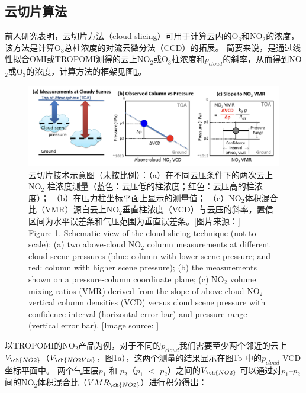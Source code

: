 \subsection{云切片算法} \label{sec:cloud-slicing}

前人研究表明，云切片方法（cloud-slicing）可用于计算云内的O$_3$和NO$_2$的浓度，
该方法是计算O$_3$总柱浓度的对流云微分法（CCD）的拓展\citep{Ziemke.1998,Ziemke.2001}。
简要来说，是通过线性拟合OMI或TROPOMI测得的云上NO$_2$或O$_3$柱浓度和$p_{cloud}$的斜率，从而得到NO$_2$或O$_3$的浓度，计算方法的框架见图\ref{fig:cloud-slicing_schematic}。


\begin{figure}[!htbp]
\centering
\includegraphics[width=\textwidth]{./figures/cloud-slicing_schematic.png}
\caption{云切片技术示意图（未按比例）：（a）在不同云压条件下的两次云上NO$_2$ 柱浓度测量（蓝色：云压低的柱浓度；红色：云压高的柱浓度）；
（b）在压力柱坐标平面上显示的测量值； （c）NO$_2$体积混合比（VMR）源自云上NO$_2$垂直柱浓度（VCD）与云压的斜率，置信区间为水平误差条和气压范围为垂直误差条。[图片来源：\citet{Choi.2014}]\\
Figure \ref{fig:cloud-slicing_schematic}. Schematic view of the cloud-slicing technique (not to scale):
(a) two above-cloud NO$_2$ column measurements at different cloud scene pressures (blue: column with lower scene pressure; and red: column with higher scene pressure);
(b) the measurements shown on a pressure-column coordinate plane;
(c) NO$_2$ volume mixing ratios (VMR) derived from the slope of above-cloud NO$_2$ vertical column densities (VCD) versus cloud scene pressure with confidence interval (horizontal error bar) and pressure range (vertical error bar). [Image source: \citet{Choi.2014}]
}
\label{fig:cloud-slicing_schematic}
\end{figure}

以TROPOMI的NO$_2$产品为例，对于不同的$p_{cloud}$我们需要至少两个邻近的云上$V_{\ch{NO2}}$（$V_{\ch{NO2Vis}}$，图\ref{fig:cloud-slicing_schematic}a），这两个测量的结果显示在图\ref{fig:cloud-slicing_schematic}b 中的$p_{cloud}$-VCD 坐标平面中。
两个气压层$p_1$ 和 $p_2$（$p_1$ $<$ $p_2$）之间的$V_{\ch{NO2}}$
可以通过对$p_1$--$p_2$间的NO$_2$体积混合比（$VMR_{\ch{NO2}}$）进行积分得出：



